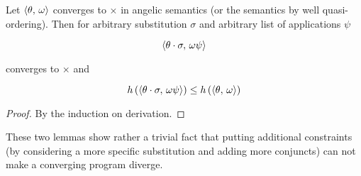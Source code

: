 \begin{lemma}
  \label{lem:weakening-contradiciton}

  Let $\langle \theta,\,\omega \rangle$ converges to $\times$ in angelic semantics (or the semantics by well quasi-ordering). Then for arbitrary substitution $\sigma$ and
  arbitrary list of applications $\psi$

  \[
  \langle \theta\cdot\sigma,\,\omega\psi \rangle
  \]

  converges to $\times$ and

  \[
  h\,(\langle \theta\cdot\sigma,\,\omega\psi \rangle)\le h\,(\langle \theta,\,\omega \rangle)
  \]
  
\end{lemma}
\begin{proof}
  By the induction on derivation.
\end{proof}

These two lemmas show rather a trivial fact that putting additional constraints (by considering a more specific substitution and adding
more conjuncts) can not make a converging program diverge.

